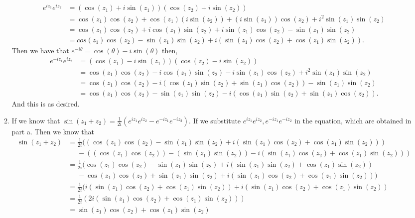 \documentclass{article}
\theoremstyle{definition}
\begin{document}
\begin{enumerate}
\begin{enumerate}
        \begin{align*}
        e^{iz_1}e^{iz_2} &=(\cos(z_1) + i\sin(z_1))(\cos(z_2) + i\sin(z_2))\\
        &= \cos(z_1)\cos(z_2) + \cos(z_1)(i\sin(z_2)) + (i\sin(z_1))\cos(z_2) + i^2\sin(z_1)\sin(z_2)\\
        &= \cos(z_1)\cos(z_2) + i\cos(z_1)\sin(z_2) + i\sin(z_1)\cos(z_2) - \sin(z_1)\sin(z_2)\\
        &= cos(z_1)\cos(z_2) - \sin(z_1)\sin(z_2) + i(\sin(z_1)\cos(z_2) + \cos(z_1)\sin(z_2)).
        \end{align*} Then we have that $e^{-i\theta} = \cos(\theta) - i \sin(\theta)$ then,
        \begin{align*}
            e^{-iz_1}e^{iz_2} &= (\cos(z_1) - i\sin(z_1))(\cos(z_2) - i\sin(z_2))\\
            &= \cos(z_1)\cos(z_2) - i\cos(z_1)\sin(z_2) - i\sin(z_1)\cos(z_2) + i^2\sin(z_1)\sin(z_2)\\
            &= \cos(z_1)\cos(z_2) - i(\cos(z_1)\sin(z_2) + \sin(z_1)\cos(z_2)) - \sin(z_1)\sin(z_2)\\
            &=\cos(z_1)\cos(z_2) - \sin(z_1)\sin(z_2) - i(\cos(z_1)\sin(z_2) + \sin(z_1)\cos(z_2)).
        \end{align*} And this is as desired.
        
        \item
        
        If we know that $\sin(z_1 + z_2) = \frac{1}{2i}(e^{iz_1}e^{iz_2} - e^{-iz_1}e^{-iz_2})$. If we substitute $e^{iz_1}e^{iz_2}, e^{-iz_1}e^{-iz_2}$ in the equation, which are obtained in part a. Then we know that 
        \begin{align*}
            \sin(z_1 + z_2) &= \frac{1}{2i}((\cos(z_1)\cos(z_2) - \sin(z_1)\sin(z_2) + i(\sin(z_1)\cos(z_2) + \cos(z_1)\sin(z_2)))\\&\phantom{=} - ((\cos(z_1)\cos(z_2)) - (\sin(z_1)\sin(z_2)) - i(\sin(z_1)\cos(z_2) + \cos(z_1)\sin(z_2)))\\
            &= \frac{1}{2i}(\cos(z_1)\cos(z_2) - \sin(z_1)\sin(z_2) + i(\sin(z_1)\sin(z_2) + \cos(z_1)\sin(z_2))\\&\phantom{=} - \cos(z_1)\cos(z_2) + \sin(z_1)\sin(z_2) + i(\sin(z_1)\cos(z_2) + \cos(z_1)\sin(z_2)))\\
            &= \frac{1}{2i}(i(\sin(z_1)\cos(z_2) + \cos(z_1)\sin(z_2)) + i(\sin(z_1)\cos(z_2) + \cos(z_1)\sin(z_2))\\
            &= \frac{1}{2i}(2i(\sin(z_1)\cos(z_2) + \cos(z_1)\sin(z_2)))\\
            &= \sin(z_1)\cos(z_2) + \cos(z_1)\sin(z_2)
        \end{align*}
        

\end{enumerate}
\end{enumerate}
\end{document}
